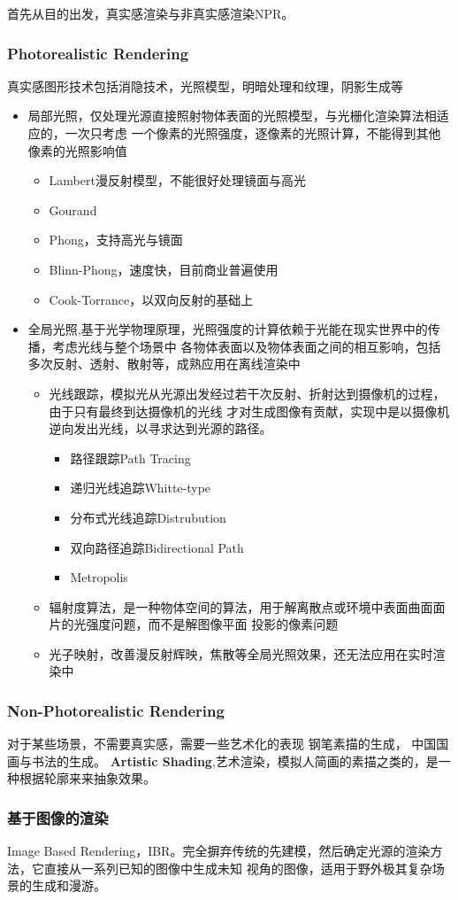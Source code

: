 首先从目的出发，真实感渲染与非真实感渲染NPR。

\subsubsection{Photorealistic Rendering}

真实感图形技术包括消隐技术，光照模型，明暗处理和纹理，阴影生成等

\begin{itemize}
    \item {局部光照，仅处理光源直接照射物体表面的光照模型，与光栅化渲染算法相适应的，一次只考虑
    一个像素的光照强度，逐像素的光照计算，不能得到其他像素的光照影响值}
    \begin{itemize}
        \item {Lambert漫反射模型，不能很好处理镜面与高光}
        \item {Gourand}
        \item {Phong，支持高光与镜面}
        \item {Blinn-Phong，速度快，目前商业普遍使用}
        \item {Cook-Torrance，以双向反射的基础上}
    \end{itemize}
    \item {全局光照,基于光学物理原理，光照强度的计算依赖于光能在现实世界中的传播，考虑光线与整个场景中
    各物体表面以及物体表面之间的相互影响，包括多次反射、透射、散射等，成熟应用在离线渲染中}
    \begin{itemize}
        \item {光线跟踪，模拟光从光源出发经过若干次反射、折射达到摄像机的过程，由于只有最终到达摄像机的光线
        才对生成图像有贡献，实现中是以摄像机逆向发出光线，以寻求达到光源的路径。}
        \begin{itemize}
            \item {路径跟踪Path Tracing}
            \item {递归光线追踪Whitte-type}
            \item {分布式光线追踪Distrubution}
            \item {双向路径追踪Bidirectional Path}
            \item {Metropolis}
        \end{itemize}
        \item {辐射度算法，是一种物体空间的算法，用于解离散点或环境中表面曲面面片的光强度问题，而不是解图像平面
        投影的像素问题}
        \item {光子映射，改善漫反射辉映，焦散等全局光照效果，还无法应用在实时渲染中}
    \end{itemize}
\end{itemize}

\subsubsection{Non-Photorealistic Rendering}
对于某些场景，不需要真实感，需要一些艺术化的表现
钢笔素描的生成，
中国国画与书法的生成。
\newline
\textbf{Artistic Shading},艺术渲染，模拟人简画的素描之类的，是一种根据轮廓来来抽象效果。

\subsubsection{基于图像的渲染}
Image Based Rendering，IBR。完全摒弃传统的先建模，然后确定光源的渲染方法，它直接从一系列已知的图像中生成未知
视角的图像，适用于野外极其复杂场景的生成和漫游。